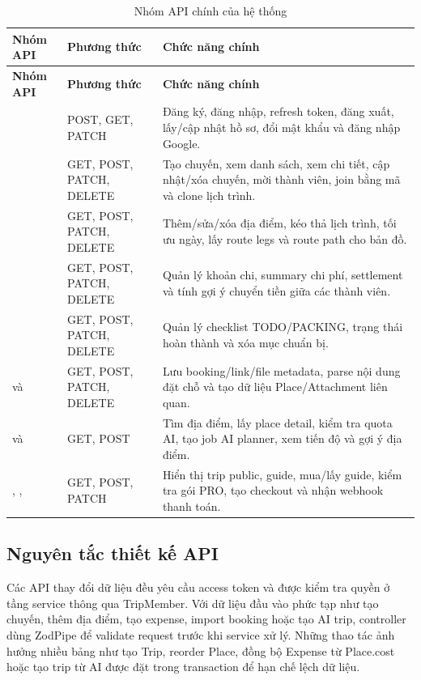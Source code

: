 \documentclass[a4paper]{report}
\begin{document}
\begin{longtable}{|P{4.5cm}|C{2.4cm}|P{8.7cm}|}
\caption{Nhóm API chính của hệ thống}\\
\hline
\textbf{Nhóm API} & \textbf{Phương thức} & \textbf{Chức năng chính}\\
\hline
\endfirsthead
\hline
\textbf{Nhóm API} & \textbf{Phương thức} & \textbf{Chức năng chính}\\
\hline
\endhead
{} & POST, GET, PATCH & Đăng ký, đăng nhập, refresh token, đăng xuất, lấy/cập nhật hồ sơ, đổi mật khẩu và đăng nhập Google.\\
\hline
{} & GET, POST, PATCH, DELETE & Tạo chuyến, xem danh sách, xem chi tiết, cập nhật/xóa chuyến, mời thành viên, join bằng mã và clone lịch trình.\\
\hline
{} & GET, POST, PATCH, DELETE & Thêm/sửa/xóa địa điểm, kéo thả lịch trình, tối ưu ngày, lấy route legs và route path cho bản đồ.\\
\hline
{} & GET, POST, PATCH, DELETE & Quản lý khoản chi, summary chi phí, settlement và tính gợi ý chuyển tiền giữa các thành viên.\\
\hline
{} & GET, POST, PATCH, DELETE & Quản lý checklist TODO/PACKING, trạng thái hoàn thành và xóa mục chuẩn bị.\\
\hline
{} và  & GET, POST, PATCH, DELETE & Lưu booking/link/file metadata, parse nội dung đặt chỗ và tạo dữ liệu Place/Attachment liên quan.\\
\hline
{} và  & GET, POST & Tìm địa điểm, lấy place detail, kiểm tra quota AI, tạo job AI planner, xem tiến độ và gợi ý địa điểm.\\
\hline
{}, ,  & GET, POST, PATCH & Hiển thị trip public, guide, mua/lấy guide, kiểm tra gói PRO, tạo checkout và nhận webhook thanh toán.\\
\hline
\end{longtable}

\subsection{Nguyên tắc thiết kế API}

Các API thay đổi dữ liệu đều yêu cầu access token và được kiểm tra quyền ở tầng service thông qua TripMember. Với dữ liệu đầu vào phức tạp như tạo chuyến, thêm địa điểm, tạo expense, import booking hoặc tạo AI trip, controller dùng ZodPipe để validate request trước khi service xử lý. Những thao tác ảnh hưởng nhiều bảng như tạo Trip, reorder Place, đồng bộ Expense từ Place.cost hoặc tạo trip từ AI được đặt trong transaction để hạn chế lệch dữ liệu.
\end{document}
